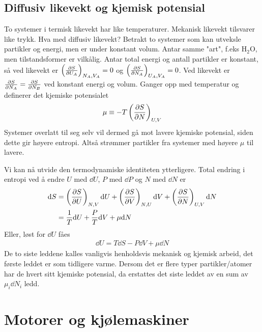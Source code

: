\documentclass[12pt]{article}
\begin{document}
\subsection{Diffusiv likevekt og kjemisk potensial}
To systemer i termisk likevekt har like temperaturer. Mekanisk likevekt tilsvarer
like trykk. Hva med diffusiv likevekt? Betrakt to systemer som kan utveksle
partikler og energi, men er under konstant volum. Antar samme "art", f.eks $\text{H}_2\text{O}$,
men tilstandsformer er vilkålig. Antar total energi og antall partikler er konstant,
så ved likevekt er $\left( \pdv{S}{U_A} \right)_{N_A, V_A} = 0$ og $\left( \pdv{S}{N_A} \right)_{U_A, V_A} = 0$.
Ved likevekt er $\pdv{S}{N_A} = \pdv{S}{N_B}$ ved konstant energi og volum. Ganger opp
med temperatur og definerer det kjemiske potensialet
\begin{align*}
  \mu \equiv - T \left(\pdv{S}{N} \right)_{U,V}
\end{align*}
Systemer overlatt til seg selv vil dermed gå mot lavere kjemiske potensial, siden
dette gir høyere entropi. Altså strømmer partikler fra systemer med høyere $\mu$
til lavere.

Vi kan nå utvide den termodynamiske identiteten ytterligere. Total endring i entropi
ved å endre $U$ med $\dd U$, $P$ med $\dd P$ og $N$ med $\dd N$ er
\begin{align*}
  \dd S &= \left( \pdv{S}{U} \right)_{N, V} \dd U + \left( \pdv{S}{V} \right)_{N, U} \dd V + \left( \pdv{S}{N} \right)_{U, V} \dd N\\
        &= \frac{1}{T} \dd U + \frac{P}{T} \dd V + \mu \dd N
\end{align*}
Eller, løst for $\dd U$ fåes
\begin{align*}
  \dd U = T \dd S - P \dd V + \mu \dd N
\end{align*}
De to siste leddene kalles vanligvis henholdsvis mekanisk og kjemisk arbeid, det
første leddet er som tidligere varme. Dersom det er flere typer partikler/atomer
har de hvert sitt kjemiske potensial, da erstattes det siste leddet av en sum
av $\mu_i \dd N_i$ ledd.
\section{Motorer og kjølemaskiner}
\end{document}
